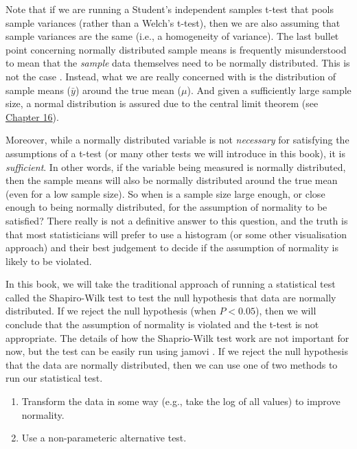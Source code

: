 \documentclass[
  openany]{scrbook}
\providecommand{\tightlist}{%
  \setlength{\itemsep}{0pt}\setlength{\parskip}{0pt}}
\begin{document}
Note that if we are running a Student's independent samples t-test that pools sample variances (rather than a Welch's t-test), then we are also assuming that sample variances are the same (i.e., a homogeneity of variance).
The last bullet point concerning normally distributed sample means is frequently misunderstood to mean that the \emph{sample} data themselves need to be normally distributed.
This is not the case \citep{Johnson1995, Lumley2002}.
Instead, what we are really concerned with is the distribution of sample means (\(\bar{y}\)) around the true mean (\(\mu\)).
And given a sufficiently large sample size, a normal distribution is assured due to the central limit theorem (see \protect\hyperlink{Chapter_16}{Chapter 16}).

Moreover, while a normally distributed variable is not \emph{necessary} for satisfying the assumptions of a t-test (or many other tests we will introduce in this book), it is \emph{sufficient}.
In other words, if the variable being measured is normally distributed, then the sample means will also be normally distributed around the true mean (even for a low sample size).
So when is a sample size large enough, or close enough to being normally distributed, for the assumption of normality to be satisfied?
There really is not a definitive answer to this question, and the truth is that most statisticians will prefer to use a histogram (or some other visualisation approach) and their best judgement to decide if the assumption of normality is likely to be violated.

In this book, we will take the traditional approach of running a statistical test called the Shapiro-Wilk test to test the null hypothesis that data are normally distributed.
If we reject the null hypothesis (when \(P < 0.05\)), then we will conclude that the assumption of normality is violated and the t-test is not appropriate.
The details of how the Shaprio-Wilk test work are not important for now, but the test can be easily run using jamovi \citep{Jamovi2022}.
If we reject the null hypothesis that the data are normally distributed, then we can use one of two methods to run our statistical test.

\begin{enumerate}
\def\labelenumi{\arabic{enumi}.}
\tightlist
\item
  Transform the data in some way (e.g., take the log of all values) to improve normality.
\item
  Use a non-parameteric alternative test.
\end{enumerate}
\end{document}
